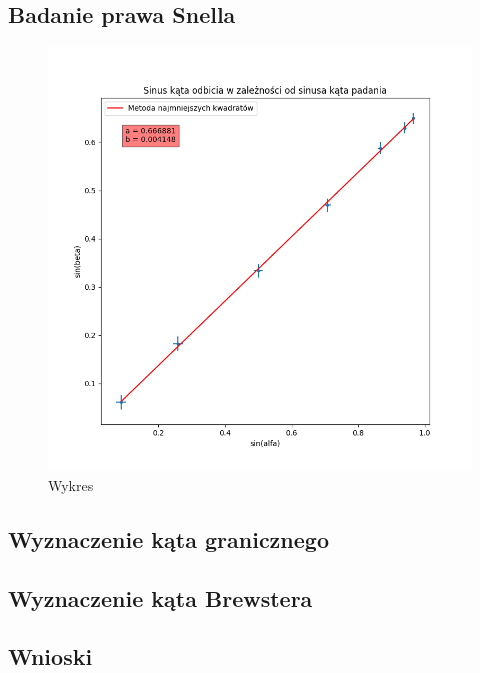 \documentclass[a4paper]{article}
\begin{document}
\subsection{Badanie prawa Snella}

\begin{figure}[h]
\centering
\includegraphics[scale=0.7]{snell.png}
\caption{Wykres }
\end{figure}


\subsection{Wyznaczenie kąta granicznego}
\subsection{Wyznaczenie kąta Brewstera}


\subsection{Wnioski}
\end{document}
